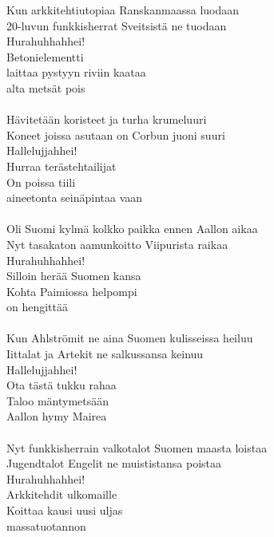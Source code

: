 
            Kun arkkitehtiutopiaa Ranskanmaassa luodaan \\
            20-luvun funkkisherrat Sveitsistä ne tuodaan \\
            Hurahuhhahhei! \\
            Betonielementti \\
            laittaa pystyyn riviin kaataa \\
            alta metsät pois \\
\hspace{10mm} \\
            Hävitetään koristeet ja turha krumeluuri \\
            Koneet joissa asutaan on Corbun juoni suuri \\
            Hallelujjahhei! \\
            Hurraa terästehtailijat \\
            On poissa tiili \\
            aineetonta seinäpintaa vaan \\
\hspace{10mm} \\
            Oli Suomi kylmä kolkko paikka ennen Aallon aikaa \\
            Nyt tasakaton aamunkoitto Viipurista raikaa \\
            Hurahuhhahhei! \\
            Silloin herää Suomen kansa \\
            Kohta Paimiossa helpompi \\
            on hengittää \\
\hspace{10mm} \\
            Kun Ahlströmit ne aina Suomen kulisseissa heiluu \\
            Iittalat ja Artekit ne salkussansa keinuu \\
            Hallelujjahhei! \\
            Ota tästä tukku rahaa \\
            Taloo mäntymetsään \\
            Aallon hymy Mairea \\
\hspace{10mm} \\
            Nyt funkkisherrain valkotalot Suomen maasta loistaa \\
            Jugendtalot Engelit ne muististansa poistaa \\
            Hurahuhhahhei! \\
            Arkkitehdit ulkomaille \\
            Koittaa kausi uusi uljas \\
            massatuotannon \\

